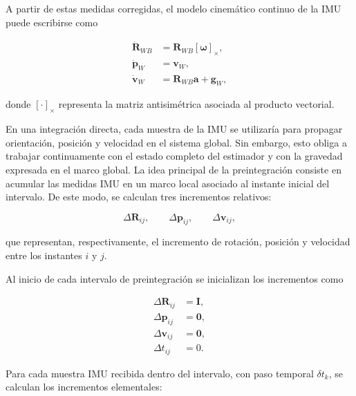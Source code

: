 A partir de estas medidas corregidas, el modelo cinemático continuo de la IMU puede escribirse como

\begin{equation}
\begin{aligned}
    \dot{\mathbf{R}}_{WB}
    &=
    \mathbf{R}_{WB}
    \left[
        \boldsymbol{\omega}
    \right]_{\times},
    \\
    \dot{\mathbf{p}}_{W}
    &=
    \mathbf{v}_{W},
    \\
    \dot{\mathbf{v}}_{W}
    &=
    \mathbf{R}_{WB}
    \mathbf{a}
    +
    \mathbf{g}_{W},
\end{aligned}
\end{equation}

donde $\left[\cdot\right]_{\times}$ representa la matriz antisimétrica asociada al producto vectorial.

En una integración directa, cada muestra de la IMU se utilizaría para propagar orientación, posición y velocidad en el sistema 
global. Sin embargo, esto obliga a trabajar continuamente con el estado completo del estimador y con la gravedad expresada en el marco 
global. La idea principal de la preintegración consiste en acumular las medidas IMU en un marco local asociado al instante inicial del 
intervalo. De este modo, se calculan tres incrementos relativos:

\begin{equation}
    \Delta \mathbf{R}_{ij},
    \qquad
    \Delta \mathbf{p}_{ij},
    \qquad
    \Delta \mathbf{v}_{ij},
\end{equation}

que representan, respectivamente, el incremento de rotación, posición y velocidad entre los instantes $i$ y $j$.

Al inicio de cada intervalo de preintegración se inicializan los incrementos como

\begin{equation}
\begin{aligned}
    \Delta \mathbf{R}_{ij}
    &=
    \mathbf{I},
    \\
    \Delta \mathbf{p}_{ij}
    &=
    \mathbf{0},
    \\
    \Delta \mathbf{v}_{ij}
    &=
    \mathbf{0},
    \\
    \Delta t_{ij}
    &=
    0.
\end{aligned}
\end{equation}

Para cada muestra IMU recibida dentro del intervalo, con paso temporal $\delta t_k$, se calculan los incrementos elementales:

